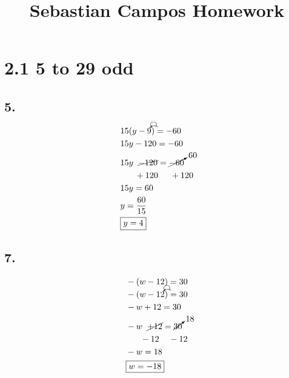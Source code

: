\documentclass{article}
\title{Sebastian Campos Homework}
\newcommand{\tikzmark}[1]{\tikz[overlay,remember picture] \node (#1) {};}
\newcommand{\DrawBox}[2]{%
    \begin{tikzpicture}[overlay,remember picture]
        \draw[->,shorten >=5pt,shorten <=5pt,out=70,in=130,distance=0.5cm,#1] (MarkA.north) to (MarkC.north);
        \draw[->,shorten >=5pt,shorten <=5pt,out=50,in=140,distance=0.3cm,#2] (MarkA.north) to (MarkB.north);
    \end{tikzpicture}
}
\begin{document}
    \maketitle
    \noindent
    \section*{2.1 5 to 29 odd}
    \subsection*{5.}
        \begin{align*}
            & \tikzmark{MarkA}15(y\tikzmark{MarkB}-9\tikzmark{MarkC})\DrawBox{black}{black} = -60 \\
            & 15y - 120 = -60 \\
            & 15y \hspace{.2cm}\cancel{-120} = \cancelto{60}{-60} \\
            &\hspace{.6cm} + 120 \hspace{.5cm} + 120 \\
            & 15y = 60 \\
            & y = \frac{60}{15} \\
            & \boxed{y = 4}
        \end{align*}

    \subsection*{7.}
        \begin{align*}
            & - (w - 12) = 30 \\
            & \tikzmark{MarkA}-(w\tikzmark{MarkB} - 12\tikzmark{MarkC})\DrawBox{black}{black} = 30 \\
            & -w + 12 = 30 \\
            & -w \hspace{.2cm}\cancel{+ 12} = \cancelto{18}{30} \\
            &\hspace{.6cm} - 12 \hspace{.4cm} - 12 \\
            & -w = 18 \\
            & \boxed{w = -18}
        \end{align*}
\end{document}
